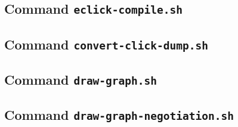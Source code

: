 \documentclass[a4paper]{article}
\begin{document}
  \subsection{Command \texttt{eclick-compile.sh}}
  

  \subsection{Command \texttt{convert-click-dump.sh}}
  
  
  \subsection{Command \texttt{draw-graph.sh}}
  
  
  \subsection{Command \texttt{draw-graph-negotiation.sh}}
  
\end{document}

